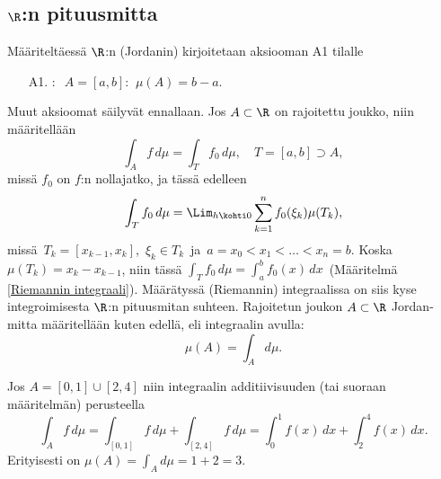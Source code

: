 \subsection{$\R$:n pituusmitta}

Määriteltäessä $\R$:n (Jordanin)  kirjoitetaan aksiooman A1 tilalle
\begin{itemize}
\item[A1.] : $\,\ A=[a,b]: \,\ \mu(A)=b-a$.
\end{itemize}
Muut aksioomat säilyvät ennallaan. Jos $A\subset\R$ on rajoitettu joukko, niin määritellään
\[
\int_A f\,d\mu = \int_T f_0\,d\mu, \quad T=[a,b] \supset A,
\]
missä $f_0$ on $f$:n nollajatko, ja tässä edelleen
\[
\int_T f_0\,d\mu = \Lim_{h \kohti 0} \sum_{k=1}^n f_0(\xi_k)\mu(T_k),
\]
missä $\,T_k=[x_{k-1},x_k]$, $\,\xi_k \in T_k\,$ ja $\,a=x_0<x_1 < \ldots <x_n=b$. Koska
$\mu(T_k)=x_k-x_{k-1}$, niin tässä $\int_T f_0\,d\mu=\int_a^b f_0(x)\,dx\,$ (Määritelmä
\ref{Riemannin integraali}). Määrätyssä (Riemannin) integraalissa on siis kyse integroimisesta
$\R$:n pituusmitan suhteen. Rajoitetun joukon $A\subset\R$ Jordan-mitta määritellään kuten
edellä, eli integraalin avulla:
\[
\mu(A)=\int_A d\mu.
\]
\begin{Exa} Jos $A=[0,1]\cup[2,4]$ niin integraalin additiivisuuden (tai suoraan määritelmän)
perusteella
\[
\int_A f\,d\mu = \int_{[0,1]} f\,d\mu+\int_{[2,4]} f\,d\mu 
               = \int_0^1 f(x)\,dx+\int_2^4 f(x)\,dx.
\]
Erityisesti on $\mu(A)=\int_A d\mu = 1+2=3$. \loppu
\end{Exa}

